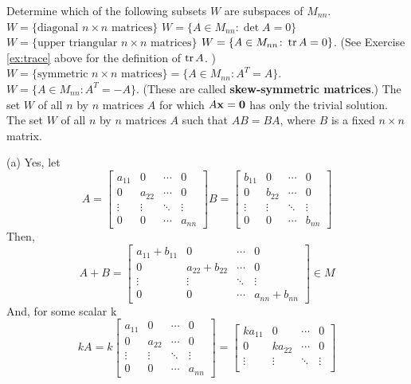 \ii Determine which of the following subsets $W$ are subspaces of $M_{nn}$.
\bb
\ii $W=\{\text{diagonal $n\times n$ matrices}\}$ 
\ii $W=\{A\in M_{nn}\colon \det A=0\}$
\ii $W=\{\text{upper triangular $n\times n$ matrices}\}$ 
\ii $W=\{A\in M_{nn}\colon \tr A=0\}$.  (See Exercise \ref{ex:trace} above for the definition of $\tr A$. )
\ii $W=\{\text{symmetric $n\times n$ matrices}\}=\{A\in M_{nn}\colon A^T=A\}$. 
\ii $W=\{A\in M_{nn}\colon A^T = -A\}$. (These are called {\bf skew-symmetric matrices}.)
\ii The set $W$ of all $n$ by $n$ matrices $A$ for which $A\boldx = \bold0$ has only the trivial solution.
\ii The set $W$ of all $n$ by $n$ matrices $A$ such that $AB=BA$, where $B$ is a fixed $n\times n$ matrix.
\ee
\begin{solution}
\noindent
(a) Yes, let
$$ A = 
\begin{bmatrix}
  a_{11} & 0 & \cdots & 0 \\
  0 & a_{22} & \cdots & 0 \\
  \vdots  & \vdots  & \ddots & \vdots  \\
  0 & 0 & \cdots & a_{nn} 
 \end{bmatrix}
B = \begin{bmatrix}
  b_{11} & 0 & \cdots & 0 \\
  0 & b_{22} & \cdots & 0 \\
  \vdots  & \vdots  & \ddots & \vdots  \\
  0 & 0 & \cdots & b_{nn} 
 \end{bmatrix}
 $$
 Then,
 $$
 A + B = 
  \begin{bmatrix}
  a_{11} + b_{11} & 0 & \cdots & 0 \\
  0 & a_{22}+b_{22} & \cdots & 0 \\
  \vdots  & \vdots  & \ddots & \vdots  \\
  0 & 0 & \cdots & a_{nn}+b_{nn} 
 \end{bmatrix}
 \in M
 $$
 And, for some scalar k
 $$
 kA = k\begin{bmatrix}
  a_{11} & 0 & \cdots & 0 \\
  0 & a_{22} & \cdots & 0 \\
  \vdots  & \vdots  & \ddots & \vdots  \\
  0 & 0 & \cdots & a_{nn} 
 \end{bmatrix}
 =
 \begin{bmatrix}
  ka_{11} & 0 & \cdots & 0 \\
  0 & ka_{22} & \cdots & 0 \\
  \vdots  & \vdots  & \ddots & \vdots  \\

\end{bmatrix}$$
\end{solution}
